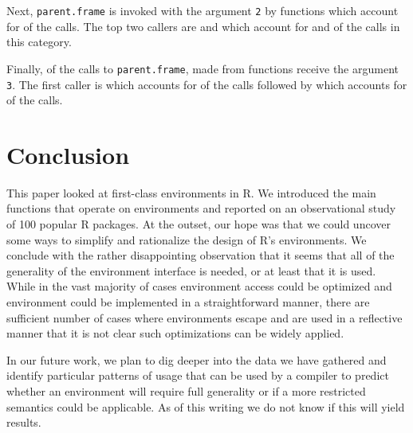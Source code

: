 \documentclass[10pt,review,sigplan,authorversion=true]{acmart}
\renewcommand{\c}[1]{\lstinline |#1|\xspace}
\begin{document}
Next, \c{parent.frame} is invoked with the argument \c{2} by
\ParentFrameDepthTwoFunCnt functions which account for
\ParentFrameDepthTwoCallPerc of the calls. The top two callers are
\ParentFrameDepthTwoCallerOneCallerName and
\ParentFrameDepthTwoCallerTwoCallerName which account for
\ParentFrameDepthTwoCallerOneCallPerc and \ParentFrameDepthTwoCallerTwoCallPerc
of the calls in this category.

Finally, \ParentFrameDepthThreeCallPerc of the calls to \c{parent.frame}, made
from \ParentFrameDepthThreeFunCnt functions receive the argument \c{3}. The
first caller is \ParentFrameDepthThreeCallerOneCallerName which accounts for
\ParentFrameDepthThreeCallerOneCallPerc of the calls followed by
\ParentFrameDepthThreeCallerTwoCallerName which accounts for
\ParentFrameDepthThreeCallerTwoCallPerc of the calls.


\section{Conclusion}

This paper looked at first-class environments in R. We introduced the main
functions that operate on environments and reported on an observational study of
100 popular R packages. At the outset, our hope was that we could uncover some
ways to simplify and rationalize the design of R's environments. We conclude
with the rather disappointing observation that it seems that all of the
generality of the environment interface is needed, or at least that it is used.
While in the vast majority of cases environment access could be optimized and
environment could be implemented in a straightforward manner, there are
sufficient number of cases where environments escape and are used in a
reflective manner that it is not clear such optimizations can be widely applied.

In our future work, we plan to dig deeper into the data we have gathered and
identify particular patterns of usage that can be used by a compiler to predict
whether an environment will require full generality or if a more restricted
semantics could be applicable. As of this writing we do not know if this will
yield results.


\end{document}
